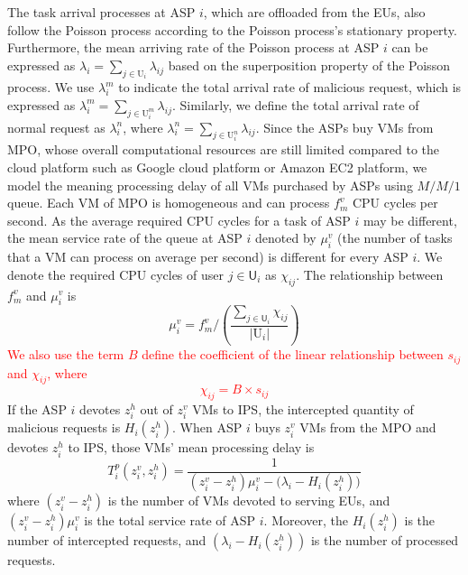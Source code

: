 \documentclass[10pt,journal, compsoc]{IEEEtran}
\begin{document}
The task arrival processes at ASP $i$, which are offloaded from the EUs, also follow the Poisson process according to the Poisson process's stationary property. Furthermore, the mean arriving rate of the Poisson process at ASP $i$ can be expressed as $\lambda_i = \sum_{j \in \mathrm{U}_i} \lambda_{ij}$ based on the superposition property of the Poisson process. We use $\lambda_i^m$ to indicate the total arrival rate of malicious request, which is expressed as $\lambda_i^m = \sum_{j \in \mathrm{U}_i^m} \lambda_{ij}$. Similarly, we define the total arrival rate of normal request as $\lambda_i^n$, where $\lambda_i^n =  \sum_{j \in \mathrm{U}_i^n} \lambda_{ij}$. Since the ASPs buy VMs from MPO, whose overall computational resources are still limited compared to the cloud platform such as Google cloud platform or Amazon EC2 platform, we model the meaning processing delay of all VMs purchased by ASPs using $M/M/1$ queue. Each VM of MPO is homogeneous and can process $f_m^v$ CPU cycles per second. As the average required CPU cycles for a task of ASP $i$ may be different, the mean service rate of the queue at ASP $i$ denoted by $\mu_i^v$ (the number of tasks that a VM can process on average per second) is different for every ASP $i$. We denote the required CPU cycles of user $j \in \mathsf{U}_i$ as $\chi_{ij}$. The relationship between $f_m^v$ and $\mu_i^v$ is
\begin{equation}\label{eqn:service_rate}
\mu_i^v = f_m^v/(\frac{\sum_{j \in \mathsf{U}_i} \chi_{ij}}{|\mathrm{U}_i|})
\end{equation}
\textcolor{red}{We also use the term $B$ define the coefficient of the linear relationship between $s_{ij}$ and $\chi_{ij}$, where 
\begin{equation}\label{eqn:required_cpu}
\chi_{ij} = B \times s_{ij}
\end{equation}
}
If the ASP $i$ devotes $z_i^h$ out of $z_i^v$ VMs to IPS, the intercepted quantity of malicious requests is $H_i(z_i^h)$. When ASP $i$ buys $z_i^v$ VMs from the MPO and devotes $z_i^h$ to IPS, those VMs' mean processing delay is
\begin{equation} \label{eqn:asp_mm1_delay}
T_i^p(z_i^v, z_i^h) = \frac{1}{(z_i^v - z_i^h)\mu_i^v - \big(\lambda_i - H_i(z_i^h)\big)}
\end{equation}
where $(z_i^v - z_i^h)$ is the number of VMs devoted to serving EUs, and $(z_i^v - z_i^h)\mu_i^v$ is the total service rate of ASP $i$. Moreover, the $H_i(z_i^h)$ is the number of intercepted requests, and $(\lambda_i - H_i(z_i^h))$ is the number of processed requests.
\end{document}

